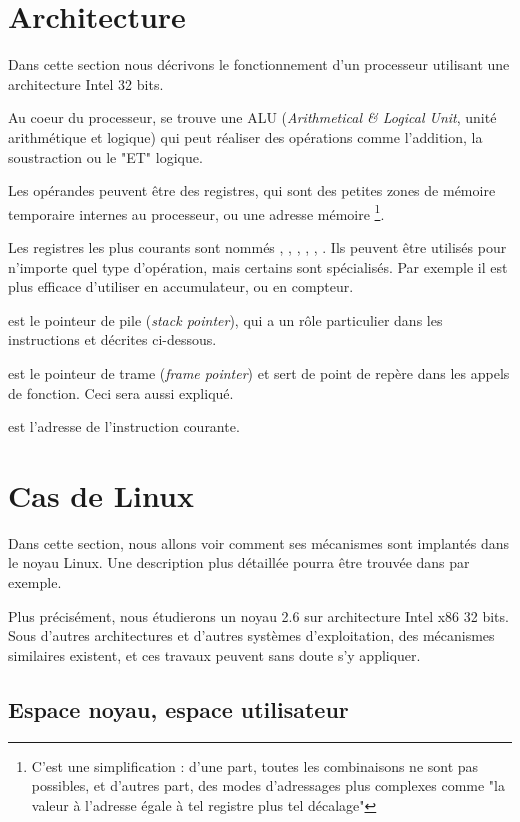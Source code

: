 \section{Architecture}

Dans cette section nous décrivons le fonctionnement d'un processeur utilisant
une architecture Intel 32 bits.

Au coeur du processeur, se trouve une ALU (\emph{Arithmetical \& Logical Unit},
unité arithmétique et logique) qui peut réaliser des opérations comme
l'addition, la soustraction ou le "ET" logique.

Les opérandes peuvent être des registres, qui sont des petites zones de mémoire
temporaire internes au processeur, ou une adresse mémoire \footnote{C'est une
simplification : d'une part, toutes les combinaisons ne sont pas possibles, et
d'autres part, des modes d'adressages plus complexes comme "la valeur à
l'adresse égale à tel registre plus tel décalage"}.

Les registres les plus courants sont nommés \eax, \ebx, \ecx, \edx, \esi, \edi.
Ils peuvent être utilisés pour n'importe quel type d'opération, mais certains
sont spécialisés. Par exemple il est plus efficace d'utiliser \eax en
accumulateur, ou \ecx en compteur.

\esp est le pointeur de pile (\emph{stack pointer}), qui a un rôle particulier
dans les instructions  et  décrites ci-dessous.

\ebp est le pointeur de trame (\emph{frame pointer}) et sert de point de repère
dans les appels de fonction. Ceci sera aussi expliqué.

\eip est l'adresse de l'instruction courante.

\section{Cas de Linux}

Dans cette section, nous allons voir comment ses mécanismes sont implantés dans
le noyau Linux. Une description plus détaillée pourra être trouvée dans
\cite{UnderstandingTheLinuxKernel} par exemple.

Plus précisément, nous étudierons un noyau 2.6 sur architecture Intel x86 32
bits. Sous d'autres architectures et d'autres systèmes d'exploitation, des
mécanismes similaires existent, et ces travaux peuvent sans doute s'y appliquer.

\subsection{Espace noyau, espace utilisateur}

